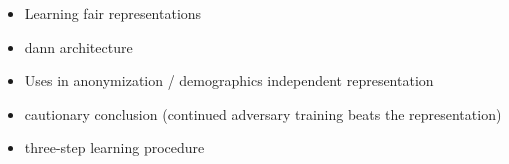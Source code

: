 \begin{itemize}
    \item Learning fair representations \citep{zemel2013learning}
    \item \Ac{dann} architecture \citep{ganin2016domain}
    \item Uses in anonymization / demographics independent representation \citet{elazar2018adversarial,li2018towards}
    \item \citet{elazar2018adversarial} cautionary conclusion (continued adversary training beats the representation)
    \item \citet{feutry2018learning} three-step learning procedure
\end{itemize}
